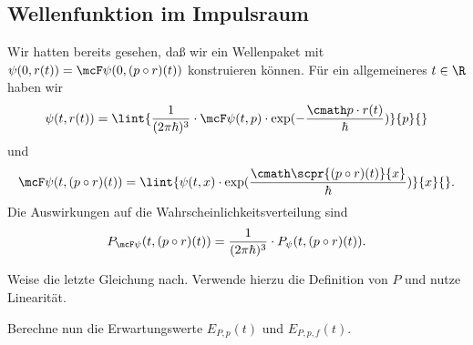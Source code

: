 \documentclass{subfiles}
\begin{document}
    \subsection*{Wellenfunktion im Impulsraum}
        Wir hatten bereits gesehen, daß wir ein Wellenpaket mit $\psi(0,r(t)) = \mcF\psi(0,(p\circ r)(t))$ konstruieren können. Für ein allgemeineres $t\in\R$ haben wir 
        \[\psi(t,r(t)) = \lint{\frac{1}{(2\pi\hbar)^3}\cdot \mcF\psi(t,p)\cdot\exp(-\frac{\cmath p\cdot r(t)}{\hbar})}{p}{}\]
        und
        \[\mcF\psi(t,(p\circ r)(t)) = \lint{\psi(t,x)\cdot\exp(\frac{\cmath\scpr{(p\circ r)(t)}{x}}{\hbar})}{x}{}.\]
        Die Auswirkungen auf die Wahrscheinlichkeitsverteilung sind 
        \[P_{\mcF\psi}(t,(p\circ r)(t)) = \frac{1}{(2\pi\hbar)^3}\cdot P_\psi(t,(p\circ r)(t)).\]

        \begin{Aufgabe}
            \nr{} Weise die letzte Gleichung nach. Verwende hierzu die Definition von $P$ und nutze Linearität. 

            \nr{} Berechne nun die Erwartungswerte $E_{P,p}(t)$ und $E_{P,p,f}(t)$. 
        \end{Aufgabe}
\end{document}
